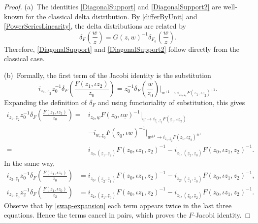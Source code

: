 \documentclass[pdftex]{sigma}
\numberwithin{equation}{section}
\theoremstyle{definition}
\begin{document}
\begin{proof}
(a)~The identities \eqref{DiagonalSupport} and \eqref{DiagonalSupport2} are well-known for the classical delta distribution. By \eqref{differByUnit} and \eqref{PowerSeriesLinearity}, the delta distributions are related by
\begin{equation}
\label{deFdeAdditive}
 \delta_F\left(\frac{w}{z}\right)=G(z,w)^{-1}\delta_{F_a}\left(\frac{w}{z}\right).
\end{equation}
Therefore, \eqref{DiagonalSupport} and \eqref{DiagonalSupport2} follow directly from the classical case.

(b)~Formally, the first term of the Jacobi identity is the substitution
\[
 i_{z_1,\underline z_2}z_0^{-1}\delta_F\left(\frac{F(z_1,\iota z_2)}{z_0}\right)
 =z_0^{-1}\delta_F\left(\frac{w}{z_0}\right)\Big|_{w^{\pm1}\to i_{z_1,\underline z_2}F(z_1,\iota \underline z_2)^{\pm1}}.
\]
Expanding the definition of $\delta_F$ and using functoriality of substitution, this gives
 \begin{align*}
 i_{z_1,\underline z_2}z_0^{-1}\delta_F\left(\frac{F(z_1,\iota z_2)}{z_0}\right)={}&
i_{z_0,\underline w}F(z_0,\iota\underline w)^{-1}\big|_{\underline w\to i_{\underline z_1, \underline z_2} F(\underline z_1,\iota \underline z_2)}\\
&-i_{w,\underline z_0}F(\underline z_0,\iota w)^{-1}\big|_{w^{\pm1}\to i_{z_1, \underline z_2} F(z_1,\iota \underline z_2)^{\pm1}}\\
={}&i_{z_0,(\underline z_1, \underline z_2)} F(z_0,\iota z_1, z_2)^{-1}-i_{z_1,(\underline z_2, \underline z_0)} F(z_0,\iota z_1, z_2)^{-1}.
 \end{align*}
In the same way,
\begin{align*}
 i_{z_2,\underline z_1}z_0^{-1}\delta_F\left(\frac{F(z_1,\iota z_2)}{z_0}\right)
 &=i_{z_0,(\underline z_2,\underline z_1)}F(z_0,\iota z_1, z_2)^{-1}-i_{z_2,(\underline z_1,\underline z_0)}F(z_0,\iota z_1, z_2)^{-1},\\
 i_{z_1,\underline z_0}z_2^{-1}\delta_F\left(\frac{F(z_1,\iota z_0)}{z_2}\right)
 &=i_{z_2,(\underline z_1, \underline z_0)}F(z_0,\iota z_1, z_2)^{-1}-i_{z_1,(\underline z_0, \underline z_2)}F(z_0,\iota z_1, z_2)^{-1}.
\end{align*}
Observe that by \eqref{swap-expansion} each term appears twice in the last three equations. Hence the terms cancel in pairs, which proves the $F$-Jacobi identity.


\end{proof}
\end{document}
